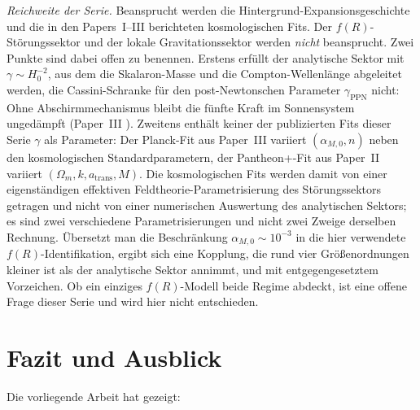 \documentclass[aps,prd,twocolumn,superscriptaddress,nofootinbib]{revtex4-2}
\begin{document}
\textit{Reichweite der Serie.} Beansprucht werden die Hintergrund-Expansionsgeschichte und die in den Papers~I--III berichteten kosmologischen Fits. Der $f(R)$-St\"orungssektor und der lokale Gravitationssektor werden \textit{nicht} beansprucht. Zwei Punkte sind dabei offen zu benennen. Erstens erf\"ullt der analytische Sektor mit $\gamma \sim H_0^{-2}$, aus dem die Skalaron-Masse und die Compton-Wellenl\"ange abgeleitet werden, die Cassini-Schranke f\"ur den post-Newtonschen Parameter $\gamma_{\mathrm{PPN}}$ nicht: Ohne Abschirmmechanismus bleibt die f\"unfte Kraft im Sonnensystem unged\"ampft (Paper~III \cite{Geiger2026c}). Zweitens enth\"alt keiner der publizierten Fits dieser Serie $\gamma$ als Parameter: Der Planck-Fit aus Paper~III variiert $(\alpha_{M,0}, n)$ neben den kosmologischen Standardparametern, der Pantheon+-Fit aus Paper~II variiert $(\Omega_m, k, a_{\mathrm{trans}}, M)$. Die kosmologischen Fits werden damit von einer eigenst\"andigen effektiven Feldtheorie-Parametrisierung des St\"orungssektors getragen und nicht von einer numerischen Auswertung des analytischen Sektors; es sind zwei verschiedene Parametrisierungen und nicht zwei Zweige derselben Rechnung. \"Ubersetzt man die Beschr\"ankung $\alpha_{M,0} \sim 10^{-3}$ in die hier verwendete $f(R)$-Identifikation, ergibt sich eine Kopplung, die rund vier Gr\"o\ss{}enordnungen kleiner ist als der analytische Sektor annimmt, und mit entgegengesetztem Vorzeichen. Ob ein einziges $f(R)$-Modell beide Regime abdeckt, ist eine offene Frage dieser Serie und wird hier nicht entschieden.

\section{Fazit und Ausblick}
\label{sec:fazit}

Die vorliegende Arbeit hat gezeigt:
\end{document}
